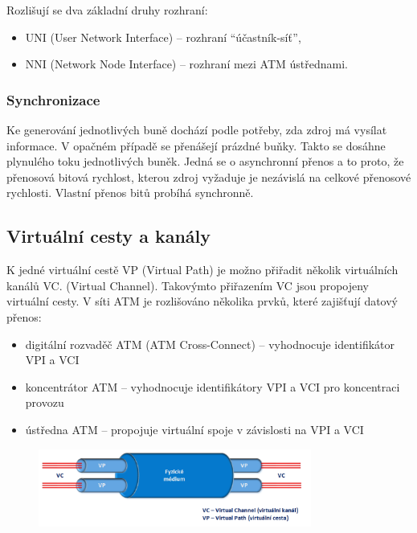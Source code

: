 Rozlišují se dva základní druhy rozhraní:
\begin{itemize}
    \item UNI (User Network Interface) -- rozhraní \enquote{účastník-síť},
    \item NNI (Network Node Interface) -- rozhraní mezi ATM ústřednami.
\end{itemize}

\subsubsection{Synchronizace}
Ke generování jednotlivých buně dochází podle potřeby, zda zdroj má vysílat informace. V opačném případě se přenášejí prázdné buňky. Takto se dosáhne
plynulého toku jednotlivých buněk. Jedná se o asynchronní přenos a to proto, že přenosová bitová rychlost, kterou zdroj vyžaduje je nezávislá na celkové přenosové rychlosti.  Vlastní přenos bitů probíhá synchronně.

\subsection{Virtuální cesty a kanály}
K jedné virtuální cestě VP (Virtual Path) je možno přiřadit několik virtuálních kanálů VC. (Virtual Channel). Takovýmto přiřazením VC jsou propojeny virtuální cesty. V síti ATM je rozlišováno několika prvků, které zajišťují datový přenos:

\begin{itemize}
    \item digitální rozvaděč ATM (ATM Cross-Connect) -- vyhodnocuje identifikátor VPI a VCI
    \item koncentrátor ATM -- vyhodnocuje identifikátory VPI a VCI pro koncentraci provozu
    \item ústředna ATM -- propojuje virtuální spoje v závislosti na VPI a VCI
\end{itemize}

\begin{figure} [h]
    \centering
    \includegraphics[width=0.8\textwidth]{snimky/VC.png}
    \label{fig:virt-cesty-kanaly}
\end{figure}

